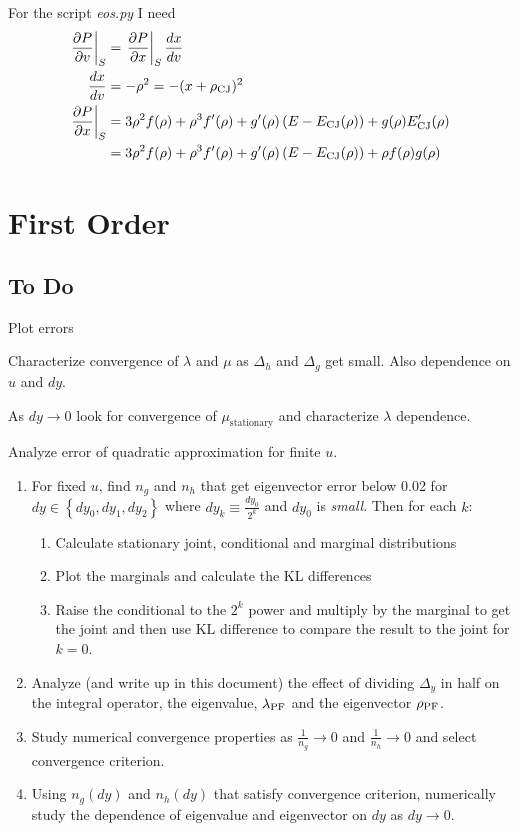 \documentclass[]{article}
\newcommand{\partialfixed}[3]{\left. \frac{\partial #1}{\partial
      #2}\right|_#3}
\newcommand\lambdaPF{\lambda_{\rm{PF}}} %
\newcommand\rhoPF{\rho_{\rm{PF}}} %
\begin{document}
For the script \emph{eos.py} I need
\begin{align*}
  \partialfixed{P}{v}{S} &= \partialfixed{P}{x}{S} \frac{d x}{d v} \\
  \frac{d x}{d v} &= -\rho^2 = -(x+\rho\CJ)^2\\
  \partialfixed{P}{x}{S} &= 3\rho^2 f(\rho) + \rho^3 f'(\rho) +
  g'(\rho) \left( E - E\CJ(\rho) \right) + g(\rho)E'\CJ(\rho) \\
  &= 3\rho^2 f(\rho) + \rho^3 f'(\rho) +
  g'(\rho) \left( E - E\CJ(\rho) \right) + \rho f(\rho)g(\rho)
\end{align*}

\section{First Order}
\label{sec:first-order}

\subsection{To Do}
\label{sec:do}

Plot errors

Characterize convergence of $\lambda$ and $\mu$ as $\Delta_h$ and
$\Delta_g$ get small.  Also dependence on $u$ and $dy$.

As $dy \rightarrow 0$ look for convergence of
$\mu_{\text{stationary}}$ and characterize $\lambda$ dependence.

Analyze error of quadratic approximation for finite $u$.

\begin{enumerate}
\item For fixed $u$, find $n_g$ and $n_h$ that get eigenvector error
  below 0.02 for $dy \in \left\{dy_0, dy_1,dy_2 \right\}$ where $dy_k
  \equiv \frac{dy_0}{2^k}$ and $dy_0$ is \emph{small}.  Then for each
  $k$:
  \begin{enumerate}
  \item Calculate stationary joint, conditional and marginal
    distributions
  \item Plot the marginals and calculate the KL differences
  \item Raise the conditional to the $2^k$ power and multiply by the
    marginal to get the joint and then use KL difference to compare
    the result to the joint for $k=0$.
  \end{enumerate}
\item Analyze (and write up in this document) the effect of dividing
  $\Delta_y$ in half on the integral operator, the eigenvalue,
  $\lambdaPF$ and the eigenvector $\rhoPF$.
\item Study numerical convergence properties as $\frac{1}{n_g}
  \rightarrow 0$ and $\frac{1}{n_h} \rightarrow 0$ and select
  convergence criterion.
\item Using $n_g(dy)$ and $n_h(dy)$ that satisfy convergence
  criterion, numerically study the dependence of eigenvalue and
  eigenvector on $dy$ as $dy \rightarrow 0$.
\end{enumerate}
\end{document}
